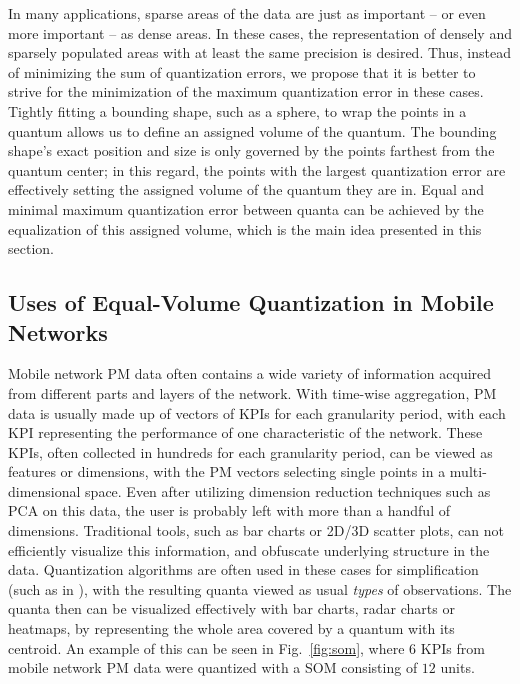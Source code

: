 			In many applications, sparse areas of the data are just as important -- or even more important -- as dense areas.
			In these cases, the representation of densely and sparsely populated areas with at least the same precision is desired.
			Thus, instead of minimizing the sum of quantization errors, we propose that it is better to strive for the minimization of the maximum quantization error in these cases.
			Tightly fitting a bounding shape, such as a sphere, to wrap the points in a quantum allows us to define an assigned volume of the quantum.
			The bounding shape's exact position and size is only governed by the points farthest from the quantum center; in this regard, the points with the largest quantization error are effectively setting the assigned volume of the quantum they are in.
			Equal and minimal maximum quantization error between quanta can be achieved by the equalization of this assigned volume, which is the main idea presented in this section.
		
		\subsection{Uses of Equal-Volume Quantization in Mobile Networks}
			\label{cha:quantization:sec:equal_probelm}
			
			Mobile network \ac{PM} data often contains a wide variety of information acquired from different parts and layers of the network.
			With time-wise aggregation, \ac{PM} data is usually made up of vectors of \acp{KPI} for each granularity period, with each \ac{KPI} representing the performance of one characteristic of the network.
			These \acp{KPI}, often collected in hundreds for each granularity period, can be viewed as features or dimensions, with the \ac{PM} vectors selecting single points in a multi-dimensional space.
			Even after utilizing dimension reduction techniques such as \ac{PCA} on this data, the user is probably left with more than a handful of dimensions.
			Traditional tools, such as bar charts or 2D/3D scatter plots, can not efficiently visualize this information, and obfuscate underlying structure in the data.
			Quantization algorithms are often used in these cases for simplification (such as in \cite{laiho, kimmo}), with the resulting quanta viewed as usual \textit{types} of observations.
			The quanta then can be visualized effectively with bar charts, radar charts or heatmaps, by representing the whole area covered by a quantum with its centroid.
			An example of this can be seen in Fig.~\ref{fig:som}, where $6$ \acp{KPI} from mobile network \ac{PM} data were quantized with a \ac{SOM} consisting of $12$ units.
			

